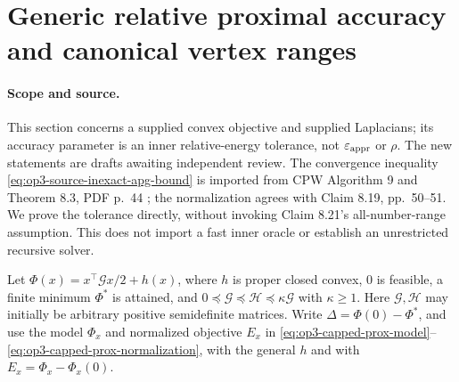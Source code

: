 \section[Generic proximal geometry]{Generic relative proximal accuracy and canonical vertex ranges}
\label{sec:op3-generic-proximal-geometry}

\paragraph{Scope and source.}
This section concerns a supplied convex objective and supplied Laplacians;
its accuracy parameter is an inner relative-energy tolerance, not
$\varepsilon_{\mathrm{appr}}$ or $\rho$. The new statements are \statusproved{} drafts
awaiting independent review. The convergence inequality
\eqref{eq:op3-source-inexact-apg-bound} is imported from CPW Algorithm 9
and Theorem 8.3, PDF p.\ 44 \citep{chen2021diffusion}; the normalization
agrees with Claim 8.19, pp.\ 50--51. We prove the tolerance directly,
without invoking Claim 8.21's all-number-range assumption. This does not
import a fast inner oracle or establish an unrestricted recursive solver.

Let $\Phi(x)=x^\top\mathcal Gx/2+h(x)$, where $h$ is proper closed convex,
$0$ is feasible, a finite minimum $\Phi^*$ is attained, and
$0\preceq\mathcal G\preceq\mathcal H\preceq\kappa\mathcal G$ with
$\kappa\geq1$. Here $\mathcal G,\mathcal H$ may initially be arbitrary
positive semidefinite matrices. Write $\Delta=\Phi(0)-\Phi^*$, and use
the model $\Phi_x$ and normalized objective $E_x$ in
\eqref{eq:op3-capped-prox-model}--\eqref{eq:op3-capped-prox-normalization},
with the general $h$ and with $E_x=\Phi_x-\Phi_x(0)$.

